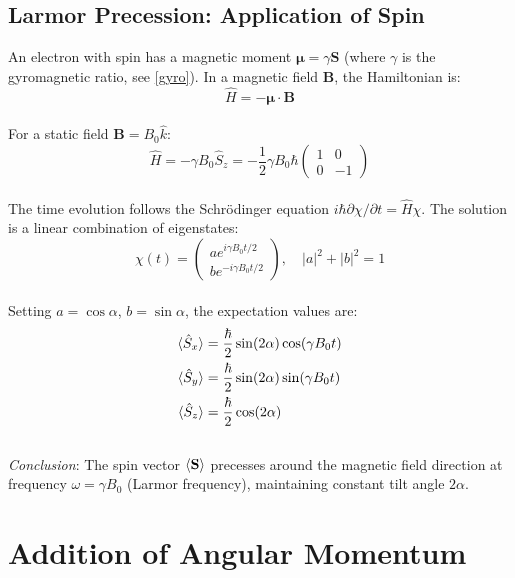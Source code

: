 \subsection{Larmor Precession: Application of Spin}

An electron with spin has a magnetic moment $\mathbf{\mu} = \gamma\mathbf{S}$ (where $\gamma$ is the gyromagnetic ratio, see \ref{gyro}). In a magnetic field $\mathbf{B}$, the Hamiltonian is:
\[
    \hat{H} = -\mathbf{\mu}\cdot\mathbf{B}
\]\\
For a static field $\mathbf{B} = B_0\hat{k}$:
\[
    \hat{H} = -\gamma B_0 \hat{S}_z = -\frac{1}{2}\gamma B_0\hbar\begin{pmatrix} 1 & 0 \\ 0 & -1 \end{pmatrix}
\]\\
The time evolution follows the Schrödinger equation $i\hbar\partial\chi/\partial t = \hat{H}\chi$. The solution is a linear combination of eigenstates:
\[
    \chi(t) = \begin{pmatrix} a e^{i\gamma B_0 t/2} \\ b e^{-i\gamma B_0 t/2} \end{pmatrix}, \quad |a|^2 + |b|^2 = 1
\]\\
Setting $a = \cos\alpha$, $b = \sin\alpha$, the expectation values are:
\[\begin{aligned}
    \langle \hat{S}_x \rangle &= \frac{\hbar}{2}\sin(2\alpha)\cos(\gamma B_0 t) \\
    \langle \hat{S}_y \rangle &= \frac{\hbar}{2}\sin(2\alpha)\sin(\gamma B_0 t) \\
    \langle \hat{S}_z \rangle &= \frac{\hbar}{2}\cos(2\alpha)
\end{aligned}\]\\
\emph{Conclusion}: The spin vector $\langle \mathbf{S} \rangle$ precesses around the magnetic field direction at frequency $\omega = \gamma B_0$ (Larmor frequency), maintaining constant tilt angle $2\alpha$.

\section{Addition of Angular Momentum}
